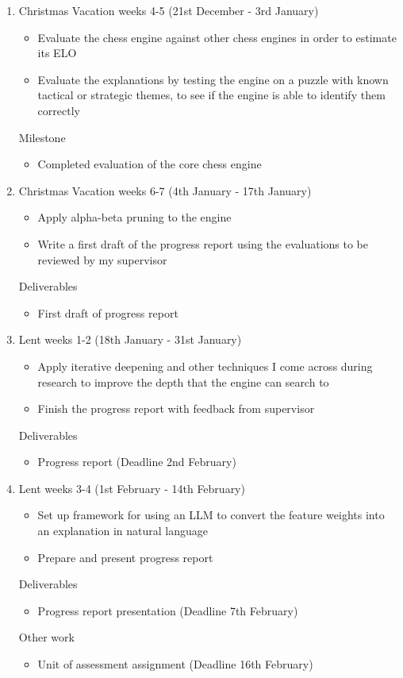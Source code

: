 \documentclass[12pt,a4paper]{article}
\begin{document}
\begin{enumerate}
    \item Christmas Vacation weeks 4-5 (21st December - 3rd January)
    \begin{itemize}
        \item Evaluate the chess engine against other chess engines in order to estimate its ELO
        \item Evaluate the explanations by testing the engine on a puzzle with known tactical or strategic themes, to see if the engine is able to identify them correctly
    \end{itemize}
    Milestone
    \begin{itemize}
        \item Completed evaluation of the core chess engine
    \end{itemize}

    \item Christmas Vacation weeks 6-7 (4th January - 17th January)
    \begin{itemize}
        \item Apply alpha-beta pruning to the engine
        \item Write a first draft of the progress report using the evaluations to be reviewed by my supervisor
    \end{itemize}
    Deliverables
    \begin{itemize}
        \item First draft of progress report
    \end{itemize}

    \item Lent weeks 1-2 (18th January - 31st January)
    \begin{itemize}
        \item Apply iterative deepening and other techniques I come across during research to improve the depth that the engine can search to
        \item Finish the progress report with feedback from supervisor
    \end{itemize}
    Deliverables
    \begin{itemize}
        \item Progress report (Deadline 2nd February)
    \end{itemize}

    \item Lent weeks 3-4 (1st February - 14th February)
    \begin{itemize}
        \item Set up framework for using an LLM to convert the feature weights into an explanation in natural language
        \item Prepare and present progress report
    \end{itemize}
    Deliverables
    \begin{itemize}
        \item Progress report presentation (Deadline 7th February)
    \end{itemize}
    Other work
    \begin{itemize}
        \item Unit of assessment assignment (Deadline 16th February)
    \end{itemize}


\end{enumerate}
\end{document}
